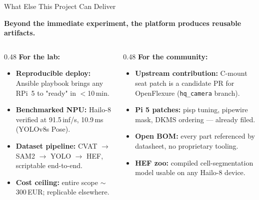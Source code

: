 \documentclass[aspectratio=169,11pt]{beamer}
\begin{document}
\begin{frame}{What Else This Project Can Deliver}

  \textbf{Beyond the immediate experiment, the platform produces reusable artifacts.}

  \vspace{0.3em}

  \begin{columns}[T]
    \begin{column}{0.48\textwidth}
      \footnotesize
      \textbf{For the lab:}
      \begin{itemize}\itemsep=0pt
        \item \textbf{Reproducible deploy:} Ansible playbook brings any RPi~5 to "ready" in $<$10\,min.
        \item \textbf{Benchmarked NPU:} Hailo-8 verified at 91.5\,inf/s, 10.9\,ms (YOLOv8s Pose).
        \item \textbf{Dataset pipeline:} CVAT $\to$ SAM2 $\to$ YOLO $\to$ HEF, scriptable end-to-end.
        \item \textbf{Cost ceiling:} entire scope $\sim$300\,EUR; replicable elsewhere.
      \end{itemize}
    \end{column}
    \begin{column}{0.48\textwidth}
      \footnotesize
      \textbf{For the community:}
      \begin{itemize}\itemsep=0pt
        \item \textbf{Upstream contribution:} C-mount seat patch is a candidate PR for OpenFlexure (\texttt{hq\_camera} branch).
        \item \textbf{Pi 5 patches:} pisp tuning, pipewire mask, DKMS ordering --- already filed.
        \item \textbf{Open BOM:} every part referenced by datasheet, no proprietary tooling.
        \item \textbf{HEF zoo:} compiled cell-segmentation model usable on any Hailo-8 device.
      \end{itemize}
    \end{column}
  \end{columns}

\end{frame}
\end{document}
